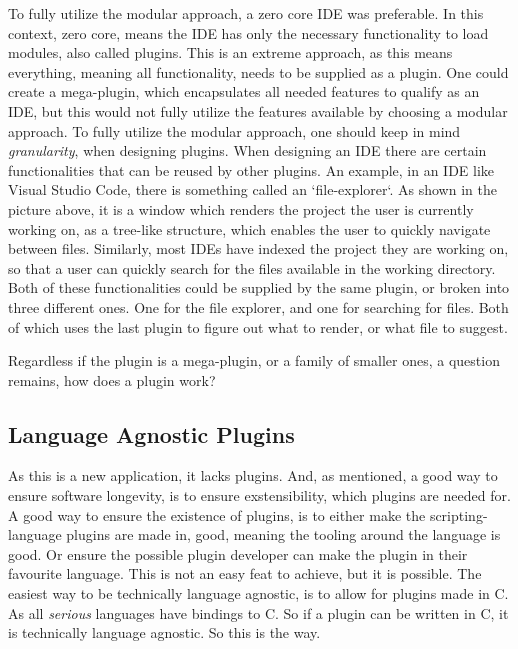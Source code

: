 \documentclass[runningheads]{llncs}
\begin{document}
To fully utilize the modular approach, a zero core IDE was preferable. In this
context, zero core, means the IDE has only the necessary functionality to load
modules, also called plugins. This is an extreme approach, as this means
everything, meaning all functionality, needs to be supplied as a plugin. One
could create a mega-plugin, which encapsulates all needed features to qualify as
an IDE, but this would not fully utilize the features available by choosing a
modular approach.
To fully utilize the modular approach, one should keep in mind
\textit{granularity}, when designing plugins. When designing an IDE there are
certain functionalities that can be reused by other plugins. An example, in
an IDE like Visual Studio Code, there is something called an `file-explorer`.
As shown in the picture above, it is a window which renders the project the
user is currently working on, as a tree-like structure, which enables the
user to quickly navigate between files. Similarly, most IDEs have indexed the
project they are working on, so that a user can quickly search for the files
available in the working directory. Both of these functionalities could be
supplied by the same plugin, or broken into three different ones.
One for the file explorer, and one for searching for files. Both of which uses
the last plugin to figure out what to render, or what file to suggest.

Regardless if the plugin is a mega-plugin, or a family of smaller ones, a
question remains, how does a plugin work?

\subsection{Language Agnostic Plugins}
As this is a new application, it lacks plugins. And, as mentioned, a good way
to ensure software longevity, is to ensure exstensibility, which plugins are
needed for. A good way to ensure the existence of plugins, is to either make
the scripting-language plugins are made in, good, meaning the tooling around the
language is good. Or ensure the possible plugin developer can make the plugin in
their favourite language. This is not an easy feat to achieve, but it is
possible.
The easiest way to be technically language agnostic, is to allow for
plugins made in C. As all \textit{serious} languages have bindings to C. So if
a plugin can be written in C, it is technically language agnostic. So this is
the way.
\end{document}
